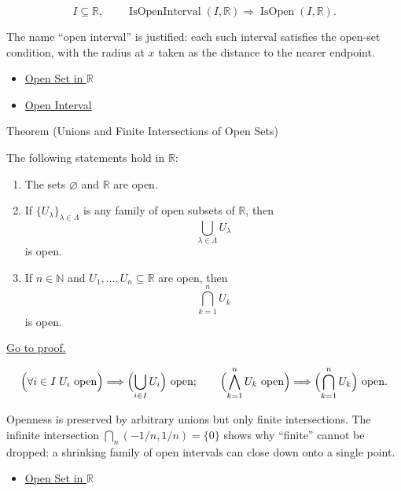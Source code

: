 \begin{remark*}
\[
I\subseteq\mathbb{R},\qquad
\operatorname{IsOpenInterval}(I,\mathbb{R})
\Longrightarrow
\operatorname{IsOpen}(I,\mathbb{R}).
\]
\end{remark*}
\begin{remark*}[Interpretation]
The name ``open interval'' is justified: each such interval satisfies the open-set condition, with the radius at $x$ taken as the distance to the nearer endpoint.
\end{remark*}
\begin{dependencies}
\begin{itemize}
  \item \hyperref[def:open-set]{Open Set in $\mathbb{R}$}
  \item \hyperref[def:open-interval]{Open Interval}
\end{itemize}
\end{dependencies}
\begin{theorembox}{Theorem (Unions and Finite Intersections of Open Sets)}
\begin{theorem}
\label{thm:open-set-closure-operations}
The following statements hold in $\mathbb{R}$:
\begin{enumerate}[label=(\roman*)]
  \item The sets $\varnothing$ and $\mathbb{R}$ are open.
  \item If $\{U_\lambda\}_{\lambda\in\Lambda}$ is any family of open subsets
  of $\mathbb{R}$, then
  \[
    \bigcup_{\lambda\in\Lambda}U_\lambda
  \]
  is open.
  \item If $n\in\mathbb{N}$ and $U_1,\ldots,U_n\subseteq\mathbb{R}$ are open,
  then
  \[
    \bigcap_{k=1}^{n}U_k
  \]
  is open.
\end{enumerate}
\hyperref[prf:open-set-closure-operations]{Go to proof.}
\end{theorem}
\end{theorembox}
\begin{remark*}
\[
\Bigl(\forall i\in I\;U_i\text{ open}\Bigr)\Longrightarrow \Bigl(\bigcup_{i\in I} U_{i}\Bigr) \text{ open};\qquad
\Bigl(\bigwedge_{k=1}^{n} U_k\text{ open}\Bigr)\Longrightarrow \Bigl(\bigcap_{k=1}^{n} U_{k}\Bigr) \text{ open}.
\]
\end{remark*}
\begin{remark*}[Interpretation]
Openness is preserved by arbitrary unions but only finite intersections. The infinite intersection $\bigcap_n(-1/n,1/n)=\{0\}$ shows why ``finite'' cannot be dropped: a shrinking family of open intervals can close down onto a single point.
\end{remark*}
\begin{dependencies}
\begin{itemize}
  \item \hyperref[def:open-set]{Open Set in $\mathbb{R}$}
\end{itemize}
\end{dependencies}
